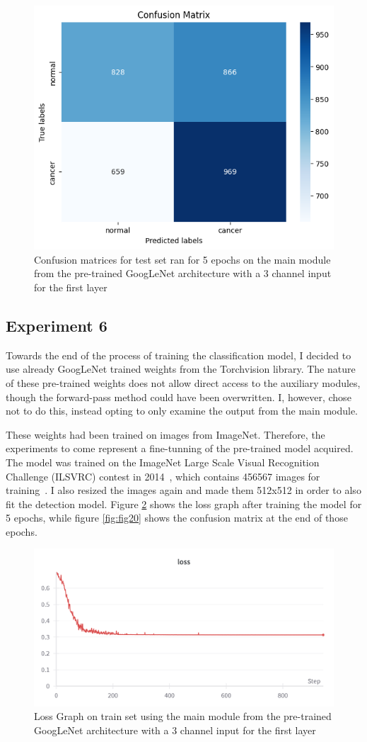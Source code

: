 \begin{figure}[H]
    \centering
    \includegraphics[width=0.5\linewidth]{figures/Figure39.png}
    \caption{Confusion matrices for test set ran for 5 epochs on the main module from the pre-trained GoogLeNet architecture with a 3 channel input for the first layer}
    \label{fig:fig32}
\end{figure}

\subsection{Experiment 6}

Towards the end of the process of training the classification model, I decided to use already GoogLeNet trained weights from the Torchvision library. The nature of these pre-trained weights does not allow direct access to the auxiliary modules, though the forward-pass method could have been overwritten. I, however, chose not to do this, instead opting to only examine the output from the main module.

These weights had been trained on images from ImageNet. Therefore, the experiments to come represent a fine-tunning of the pre-trained model acquired. The model was trained on the ImageNet Large Scale Visual Recognition Challenge (ILSVRC) contest in 2014~\cite{carte12}, which contains 456567 images for training~\cite{link16}. I also resized the images again and made them 512x512 in order to also fit the detection model. Figure \ref{fig:fig19} shows the loss graph after training the model for 5 epochs, while figure \ref{fig:fig20} shows the confusion matrix at the end of those epochs.

\begin{figure}[!ht]
    \centering
    \includegraphics[width=1\linewidth]{figures/Figure20.png}
    \caption{Loss Graph on train set using the main module from the pre-trained GoogLeNet architecture with a 3 channel input for the first layer}
    \label{fig:fig19}
\end{figure}

